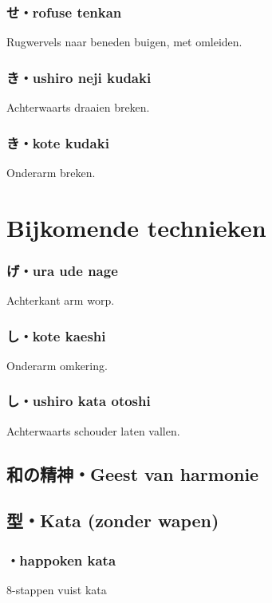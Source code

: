 \subsubsection{せ・rofuse tenkan}
Rugwervels naar beneden buigen, met omleiden.

\subsubsection{き・ushiro neji kudaki}
Achterwaarts draaien breken.

\subsubsection{き・kote kudaki}
Onderarm breken.

\section{Bijkomende technieken}
\subsubsection{げ・ura ude nage}
Achterkant arm worp.

\subsubsection{し・kote kaeshi}
Onderarm omkering.

\subsubsection{し・ushiro kata otoshi}
Achterwaarts schouder laten vallen.

\subsection{和の精神・Geest van harmonie}

\subsection{型・Kata (zonder wapen)}
\subsubsection{・happoken kata}
8-stappen vuist kata

